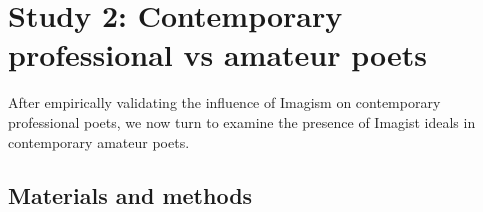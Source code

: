 \documentclass{book}
\begin{document}
\begin{figure}
\end{figure}


\section{Study 2: Contemporary professional vs amateur poets}
After empirically validating the influence of Imagism on contemporary professional poets, we now turn to examine the presence of Imagist ideals in contemporary amateur poets.

\subsection{Materials and methods}
\end{document}
